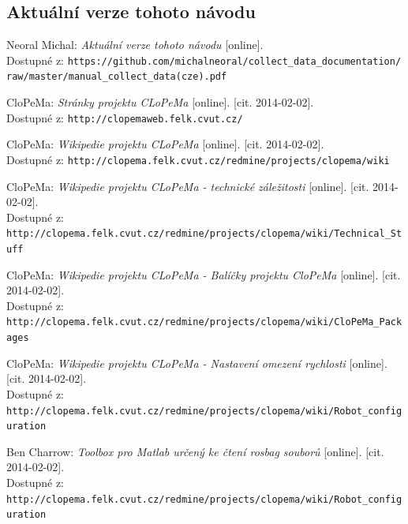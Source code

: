 \documentclass[10pt,a4paper,titlepage,oneside]{report}
\begin{document}
\begin{thebibliography}{00}

\section{Aktuální verze tohoto návodu}


   Neoral Michal:
    \emph{Aktuální verze tohoto návodu} [online]. \\
    Dostupné z: \verb|https://github.com/michalneoral/collect_data_documentation/|\\
	\verb|raw/master/manual_collect_data(cze).pdf|

   CloPeMa:
    \emph{Stránky projektu CLoPeMa} [online]. [cit. 2014-02-02].\\
    Dostupné z: \verb|http://clopemaweb.felk.cvut.cz/|

   CloPeMa:
    \emph{Wikipedie projektu CLoPeMa} [online]. [cit. 2014-02-02].\\
    Dostupné z: \verb|http://clopema.felk.cvut.cz/redmine/projects/clopema/wiki|
    
   CloPeMa:
    \emph{Wikipedie projektu CLoPeMa - technické záležitosti} [online]. [cit. 2014-02-02].\\
    Dostupné z: \verb|http://clopema.felk.cvut.cz/redmine/projects/clopema/wiki/Technical_Stuff|
    
   CloPeMa:
    \emph{Wikipedie projektu CLoPeMa - Balíčky projektu CloPeMa} [online]. [cit. 2014-02-02].\\
    Dostupné z: \verb|http://clopema.felk.cvut.cz/redmine/projects/clopema/wiki/CloPeMa_Packages|    

   CloPeMa:
    \emph{Wikipedie projektu CLoPeMa - Nastavení omezení rychlosti} [online]. [cit. 2014-02-02].\\
    Dostupné z: \verb|http://clopema.felk.cvut.cz/redmine/projects/clopema/wiki/Robot_configuration|  

   Ben Charrow:
    \emph{Toolbox pro Matlab určený ke čtení rosbag souborů} [online]. [cit. 2014-02-02].\\
    Dostupné z: \verb|http://clopema.felk.cvut.cz/redmine/projects/clopema/wiki/Robot_configuration|  


\end{thebibliography}
\end{document}
